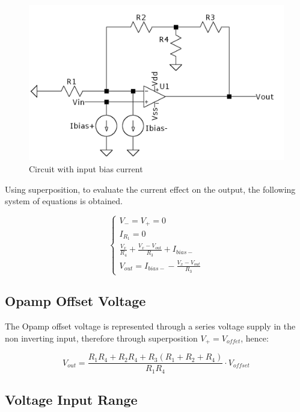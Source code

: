 \begin{figure}[H]
    \centering
    \includegraphics*[scale = 0.25]{Images/Ex1Bias.png}
    \caption{Circuit with input bias current}
    \label{Ex1Bias}
\end{figure}

Using superposition, to evaluate the current effect on the output, the following system of equations is obtained.


\begin{equation}
    \begin{cases}
    
        V_- = V_+ = 0 \\
        I_{R_1} = 0\\
        \frac{V_x}{R_4} + \frac{V_x - V_{out}}{R_3} + I_{bias-}\\
        V_{out} = I_{bias-} - \frac{V_x - V_{out}}{R_3}

    \end{cases}
\end{equation}

\subsection{Opamp Offset Voltage}

The Opamp offset voltage is represented through a series voltage supply in the non inverting input, therefore through superposition $V_+ = V_{offet}$, hence:

\begin{equation}
     V_{out} = \frac{ R_{1} R_{4} + R_{2} R_{4} + R_{3} \left(R_{1} + R_{2} + R_{4}\right)}{R_{1} R_{4}}\cdot V_{offset}
\end{equation}


\subsection{Voltage Input Range}

